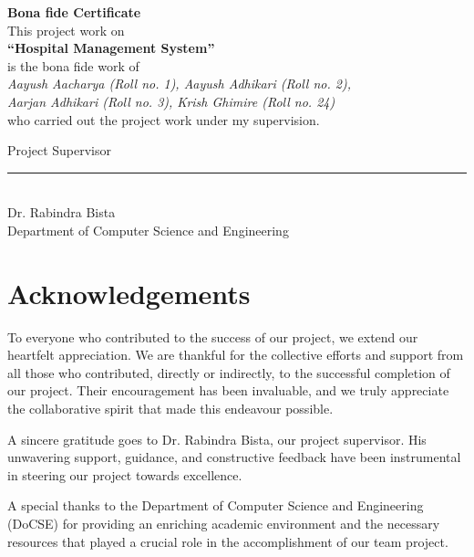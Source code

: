 \documentclass[12pt,a4paper]{report}
\begin{document}
\thispagestyle{plain}
\vspace*{\fill}
\begin{center}
{\Large\bfseries Bona fide Certificate}\\[1.1cm]
This project work on\\[4pt]
{\bfseries ``Hospital Management System''}\\[4pt]
is the bona fide work of\\[6pt]
\emph{Aayush Aacharya (Roll no. 1), Aayush Adhikari (Roll no. 2),\\
Aarjan Adhikari (Roll no. 3), Krish Ghimire (Roll no. 24)}\\[6pt]
who carried out the project work under my supervision.
\end{center}
\vspace{2.2cm}
\noindent
Project Supervisor\\[2pt]
\rule{6cm}{0.4pt}\\
Dr. Rabindra Bista\\                                     %
Department of Computer Science and Engineering
\vspace*{\fill}
\newpage

\chapter*{Acknowledgements}
To everyone who contributed to the success of our project, we extend our heartfelt
appreciation. We are thankful for the collective efforts and support from all those
who contributed, directly or indirectly, to the successful completion of our project.
Their encouragement has been invaluable, and we truly appreciate the collaborative
spirit that made this endeavour possible.

A sincere gratitude goes to Dr. Rabindra Bista, our project supervisor. His
unwavering support, guidance, and constructive feedback have been instrumental in
steering our project towards excellence.

A special thanks to the Department of Computer Science and Engineering (DoCSE) for
providing an enriching academic environment and the necessary resources that played
a crucial role in the accomplishment of our team project.
\end{document}

